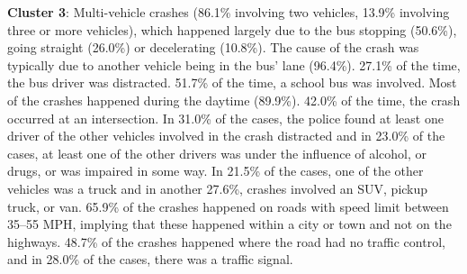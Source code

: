 
\noindent
\textbf{Cluster 3}:  Multi-vehicle crashes (86.1\% involving two vehicles, 13.9\% involving three or more vehicles), which happened largely due to the bus stopping (50.6\%), going straight (26.0\%) or decelerating (10.8\%). The cause of the crash was typically due to another vehicle being in the bus' lane (96.4\%). 27.1\% of the time, the bus driver was distracted. 51.7\% of the time, a school bus was involved. Most of the crashes happened during the daytime (89.9\%).
42.0\% of the time, the crash occurred at an intersection. In 31.0\% of the cases, the police found at least one driver of the other vehicles involved in the crash distracted and in 23.0\% of the cases, at least one of the other drivers was under the influence of alcohol, or drugs, or was impaired in some way. In 21.5\% of the cases, one of the other vehicles was a truck and in another 27.6\%, crashes involved an SUV, pickup truck, or van. 65.9\% of the crashes happened on roads with speed limit between 35--55 MPH, implying that these happened within a city or town and not on the highways.  48.7\% of the crashes happened where the road had no traffic control, and in 28.0\% of the cases, there was a traffic signal.
